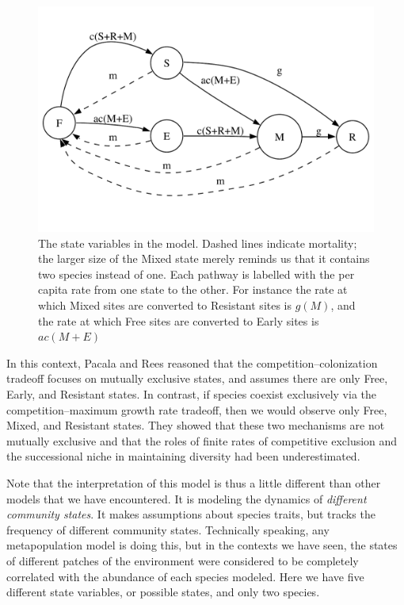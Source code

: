 \begin{figure}[ht]
  \centering
  \includegraphics[width=\textwidth]{PandR}
  \caption{The state variables in the \cite{Pacala1998} model. Dashed lines indicate mortality; the larger size of the Mixed state merely reminds us that it contains two species instead of one. Each pathway is labelled with the per capita rate from one state to the other. For instance the rate at which Mixed sites are converted to Resistant sites is $g(M)$, and the rate at which Free sites are converted to Early sites is $ac(M+E)$}
  \label{fig:PR}
\end{figure}

In this context, Pacala and Rees reasoned that the competition--colonization tradeoff focuses on mutually exclusive states, and assumes there are only Free, Early, and Resistant states. In contrast, if species coexist exclusively via the competition--maximum growth rate tradeoff, then we would observe only Free, Mixed, and Resistant states. They showed that these two mechanisms are not mutually exclusive and that the roles of finite rates of competitive exclusion and the successional niche in maintaining diversity had been underestimated.

Note that the interpretation of this model is thus a little different than other models that we have encountered. It is modeling the dynamics of \emph{different community states}. It makes assumptions about species traits, but tracks the frequency of different community states. Technically speaking, any metapopulation model is doing this, but in the contexts we have seen, the states of different patches of the environment were considered to be completely correlated with the abundance of each species modeled. Here we have five different state variables, or possible states, and only two species.

